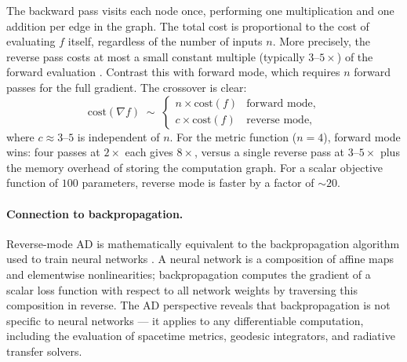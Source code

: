 The backward pass visits each node once, performing one
multiplication and one addition per edge in the graph.  The
total cost is proportional to the cost of evaluating $f$
itself, regardless of the number of inputs $n$.  More
precisely, the reverse pass costs at most a small constant
multiple (typically $3$--$5\times$) of the forward evaluation
\cite{Griewank2008}.  Contrast this with forward mode, which
requires $n$ forward passes for the full gradient.  The
crossover is clear:
%
\begin{equation}
  \text{cost}(\nabla f) \;\sim\;
  \begin{cases}
    n \times \text{cost}(f) & \text{forward mode,} \\
    c \times \text{cost}(f) & \text{reverse mode,}
  \end{cases}
  \label{eq:ad-cost-comparison}
\end{equation}
%
where $c \approx 3$--$5$ is independent of $n$.  For the
metric function ($n = 4$), forward mode wins: four passes at
$2\times$ each gives $8\times$, versus a single reverse pass
at $3$--$5\times$ plus the memory overhead of storing the
computation graph.  For a scalar objective function of $100$
parameters, reverse mode is faster by a factor of $\sim\!20$.

\paragraph{Connection to backpropagation.}

Reverse-mode AD is mathematically equivalent to the
backpropagation algorithm used to train neural networks
\cite{Baydin2018}.  A neural network is a composition of
affine maps and elementwise nonlinearities; backpropagation
computes the gradient of a scalar loss function with respect
to all network weights by traversing this composition in
reverse.  The AD perspective reveals that backpropagation is
not specific to neural networks --- it applies to any
differentiable computation, including the evaluation of
spacetime metrics, geodesic integrators, and radiative
transfer solvers.

